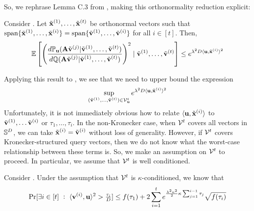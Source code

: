 So, we rephrase Lemma C.3 from \cite{simchowitz2017gap}, making this orthonormality reduction explicit:
\begin{importedlemma}
    \label{lem:orthonormal-chisquared-likelihood-ratio}
    Consider .
    Let \(\tilde{\boldsymbol{\mathrm{x}}}^{(1)},\ldots,\tilde{\boldsymbol{\mathrm{x}}}^{(t)}\) be orthonormal vectors such that \(\text{span}\{\tilde{\boldsymbol{\mathrm{x}}}^{(1)},\ldots,\tilde{\boldsymbol{\mathrm{x}}}^{(i)}\} = \text{span}\{\tilde{\boldsymbol{\mathrm{v}}}^{(1)},\ldots,\tilde{\boldsymbol{\mathrm{v}}}^{(i)}\}\) for all \(i\in[t]\).
    Then,
    \[
        \operatorname*{\mathbb{E}}\left[ \left(\frac{d{\mathbb P}_{\boldsymbol{\mathrm{u}}}(\mathbf{A}\tilde{\boldsymbol{\mathrm{v}}}^{(j)} | \tilde{\boldsymbol{\mathrm{v}}}^{(1)},\ldots,\tilde{\boldsymbol{\mathrm{v}}}^{(t)})}{d{\mathbb Q}(\mathbf{A}\tilde{\boldsymbol{\mathrm{v}}}^{(j)} | \tilde{\boldsymbol{\mathrm{v}}}^{(1)},\ldots,\tilde{\boldsymbol{\mathrm{v}}}^{(t)})}\right)^2 
        \mid
        \tilde{\boldsymbol{\mathrm{v}}}^{(1)},\ldots,\tilde{\boldsymbol{\mathrm{v}}}^{(t)}
        \right]
        \leq e^{\lambda^2 D\langle \boldsymbol{\mathrm{u}}, \tilde{\boldsymbol{\mathrm{x}}}^{(i)}\rangle^2}
    \]
\end{importedlemma}
\noindent
Applying this result to , we see that we need to upper bound the expression
\[
    \sup_{(\tilde{\boldsymbol{\mathrm{v}}}^{(1)},\ldots,\tilde{\boldsymbol{\mathrm{v}}}^{(t)})\in{\mathcal V}^t_{\boldsymbol{\mathrm{u}}}}
    e^{\lambda^2 D\langle \boldsymbol{\mathrm{u}},\tilde{\boldsymbol{\mathrm{x}}}^{(i)}\rangle^2}
\]
Unfortunately, it is not immediately obvious how to relate \(\langle \boldsymbol{\mathrm{u}},\tilde{\boldsymbol{\mathrm{x}}}^{(i)}\rangle\) to \(\tilde{\boldsymbol{\mathrm{v}}}^{(1)},\ldots\tilde{\boldsymbol{\mathrm{v}}}^{(i)}\) or \(\tau_1,\ldots,\tau_i\).
In the non-Kronecker case, when \({\mathcal V}^t\) covers all vectors in \({\mathbb S}^D\), we can take \(\tilde{\boldsymbol{\mathrm{x}}}^{(i)}=\tilde{\boldsymbol{\mathrm{v}}}^{(i)}\) without loss of generality.
However, if \({\mathcal V}^t\) covers Kronecker-structured query vectors, then we do not know what the worst-case relationship between these terms is.
So, we make an assumption on \({\mathcal V}^t\) to proceed.
In particular, we assume that \({\mathcal V}^t\) is well conditioned.
\begin{lemma}
    \label{lem:conditioning-gives-p}
    Consider .
    Under the assumption that \({\mathcal V}^t\) is \(\kappa\)-conditioned, we know that
    \[
    \Pr[\exists i \in [t] ~:~ \langle \boldsymbol{\mathrm{v}}^{(i)}, \boldsymbol{\mathrm{u}}\rangle^2 > {{\textstyle\frac{\tau_i}{D}}}]
        \leq
        f(\tau_1) + 2\sum_{i=1}^t
        e^{\frac{\lambda^2\kappa^2}{2}\kappa\sum_{j=1}^{i-1}\tau_j}
        \sqrt{f(\tau_i)}
    \]
\end{lemma}
